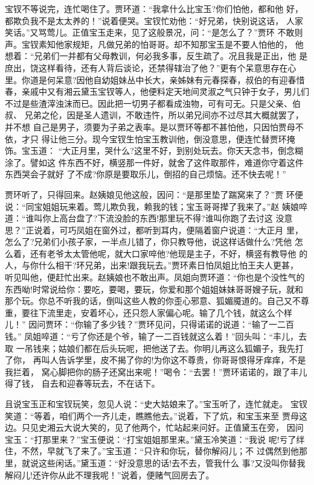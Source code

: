 宝钗不等说完，连忙喝住了。贾环道：“我拿什么比宝玉?你们怕他，都和他
好，都欺负我不是太太养的！”说着便哭。宝钗忙劝他：“好兄弟，快别说这话，
人家笑话。”又骂莺儿。正值宝玉走来，见了这般景况，问：“是怎么了？”贾环
不敢则声。宝钗素知他家规矩，凡做兄弟的怕哥哥。却不知那宝玉是不要人怕他的，
他想着：“兄弟们一并都有父母教训，何必我多事，反生疏了。况且我是正出，他
是庶出，饶这样看待，还有人背后谈论，还禁得辖治了他？”更有个呆意思存在心
里。你道是何呆意?因他自幼姐妹丛中长大，亲姊妹有元春探春，叔伯的有迎春惜
春，亲戚中又有湘云黛玉宝钗等人，他便料定天地间灵淑之气只钟于女子，男儿们
不过是些渣滓浊沫而已。因此把一切男子都看成浊物，可有可无。只是父亲、伯叔、
兄弟之伦，因是圣人遗训，不敢违忤，所以弟兄间亦不过尽其大概就罢了，并不想
自己是男子，须要为子弟之表率。是以贾环等都不甚怕他，只因怕贾母不依，才只
得让他三分。现今宝钗生怕宝玉教训他，倒没意思，便连忙替贾环掩饰。宝玉道：
“大正月里，哭什么?这里不好，到别处玩去。你天天念书，倒念糊涂了。譬如这
件东西不好，横竖那一件好，就舍了这件取那件，难道你守着这件东西哭会子就好
了不成?你原是要取乐儿，倒招的自己烦恼。还不快去呢！”

贾环听了，只得回来。赵姨娘见他这般，因问：“是那里垫了踹窝来了？”贾
环便说：“同宝姐姐玩来着。莺儿欺负我，赖我的钱；宝玉哥哥撵了我来了。”赵
姨娘啐道：“谁叫你上高台盘了?下流没脸的东西!那里玩不得?谁叫你跑了去讨这
没意思？”正说着，可巧凤姐在窗外过，都听到耳内，便隔着窗户说道：“大正月
里，怎么了?兄弟们小孩子家，一半点儿错了，你只教导他，说这样话做什么?凭他
怎么着，还有老爷太太管他呢，就大口家啐他?他现是主子，不好，横竖有教导他
的人，与你什么相干?环兄弟，出来!跟我玩去。”贾环素日怕凤姐比怕王夫人更甚，
听见叫他，便赶忙出来。赵姨娘也不敢出声。凤姐向贾环道：“你也是个没性气的
东西呦!时常说给你：要吃，要喝，要玩，你爱和那个姐姐妹妹哥哥嫂子玩，就和
那个玩。你总不听我的话，倒叫这些人教的你歪心邪意、狐媚魇道的。自己又不尊
重，要往下流里走，安着坏心，还只怨人家偏心呢。输了几个钱，就这么个样儿！”
因问贾环：“你输了多少钱？”贾环见问，只得诺诺的说道：“输了一二百钱。”
凤姐啐道：“亏了你还是个爷，输了一二百钱就这么着！”回头叫：“丰儿，去取
一吊钱来；姑娘们都在后头玩呢，把他送了去。你明儿再这么狐媚子，我先打了你，
再叫人告诉学里，皮不揭了你的!为你这不尊贵，你哥哥恨得牙痒痒，不是我拦着，
窝心脚把你的肠子还窝出来呢！”喝令：“去罢！”贾环诺诺的，跟了丰儿得了钱，
自去和迎春等玩去，不在话下。

且说宝玉正和宝钗玩笑，忽见人说：“史大姑娘来了。”宝玉听了，连忙就走。
宝钗笑道：“等着，咱们两个一齐儿走，瞧瞧他去。”说着，下了炕，和宝玉来至
贾母这边。只见史湘云大说大笑的，见了他两个，忙站起来问好。正值黛玉在旁，
因问宝玉：“打那里来？”宝玉便说：“打宝姐姐那里来。”黛玉冷笑道：“我说
呢!亏了绊住，不然，早就飞了来了。”宝玉道：“只许和你玩，替你解闷儿；不
过偶然到他那里，就说这些闲话。”黛玉道：“好没意思的话!去不去，管我什么
事?又没叫你替我解闷儿!还许你从此不理我呢！”说着，便赌气回房去了。

